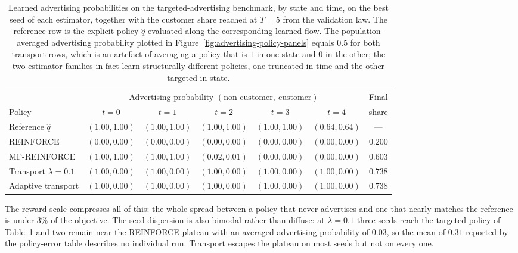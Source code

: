 \begin{table}[H]
\centering
\small
\begin{tabular}{lcccccc}
\toprule
& \multicolumn{5}{c}{Advertising probability $(\text{non-customer},\ \text{customer})$} & Final \\
\cmidrule(lr){2-6}
Policy & $t=0$ & $t=1$ & $t=2$ & $t=3$ & $t=4$ & share \\
\midrule
Reference $\widehat q$      & $(1.00,1.00)$ & $(1.00,1.00)$ & $(1.00,1.00)$ & $(1.00,1.00)$ & $(0.64,0.64)$ & --- \\
REINFORCE                   & $(0.00,0.00)$ & $(0.00,0.00)$ & $(0.00,0.00)$ & $(0.00,0.00)$ & $(0.00,0.00)$ & $0.200$ \\
MF-REINFORCE                & $(1.00,1.00)$ & $(1.00,1.00)$ & $(0.02,0.01)$ & $(0.00,0.00)$ & $(0.00,0.00)$ & $0.603$ \\
Transport $\lambda=0.1$     & $(1.00,0.00)$ & $(1.00,0.00)$ & $(1.00,0.00)$ & $(1.00,0.00)$ & $(1.00,0.00)$ & $0.738$ \\
Adaptive transport          & $(1.00,0.00)$ & $(1.00,0.00)$ & $(1.00,0.00)$ & $(1.00,0.00)$ & $(1.00,0.00)$ & $0.738$ \\
\bottomrule
\end{tabular}
\caption{Learned advertising probabilities on the targeted-advertising benchmark, by state and time, on the best seed of each estimator, together with the customer share reached at $T=5$ from the validation law. The reference row is the explicit policy $\widehat q$ evaluated along the corresponding learned flow. The population-averaged advertising probability plotted in Figure~\ref{fig:advertising-policy-panels} equals $0.5$ for both transport rows, which is an artefact of averaging a policy that is $1$ in one state and $0$ in the other; the two estimator families in fact learn structurally different policies, one truncated in time and the other targeted in state.}
\label{tab:advertising-policies}
\end{table}

The reward scale compresses all of this: the whole spread between a policy that never advertises and one that nearly matches the reference is under $3\%$ of the objective. The seed dispersion is also bimodal rather than diffuse: at $\lambda=0.1$ three seeds reach the targeted policy of Table~\ref{tab:advertising-policies} and two remain near the REINFORCE plateau with an averaged advertising probability of $0.03$, so the mean of $0.31$ reported by the policy-error table describes no individual run. Transport escapes the plateau on most seeds but not on every one.

